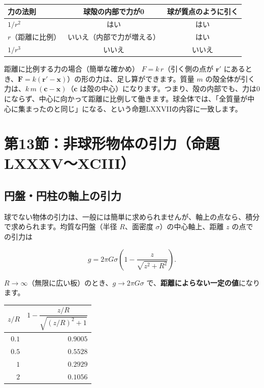 \documentclass[a4paper,11pt,openany]{ltjsbook}
\begin{document}
\begin{center}
\begin{tabular}{lcc}
\toprule
力の法則 & 球殻の内部で力が0 & 球が質点のように引く\\
\midrule
$1/r^2$ & はい & はい\\
$r$（距離に比例） & いいえ（内部で力が増える） & はい\\
$1/r^3$ & いいえ & いいえ\\
\bottomrule
\end{tabular}
\end{center}

\begin{examplebox}{距離に比例する力の場合（簡単な確かめ）}
$F=k\,r$（引く側の点が $\mathbf r'$ にあるとき、$\mathbf F=k(\mathbf r'-\mathbf x)$）の形の力は、足し算ができます。質量 $m$ の殻全体が引く力は、$k\,m\,(\mathbf c-\mathbf x)$（$\mathbf c$ は殻の中心）になります。つまり、殻の内部でも、力は0にならず、中心に向かって距離に比例して働きます。球全体では、「全質量が中心に集まったのと同じ」になる、という命題LXXVIIの内容に一致します。
\end{examplebox}

\section{第13節：非球形物体の引力（命題LXXXV〜XCIII）}

\subsection{円盤・円柱の軸上の引力}

球でない物体の引力は、一般には簡単に求められませんが、軸上の点なら、積分で求められます。均質な円盤（半径 $R$、面密度 $\sigma$）の中心軸上、距離 $z$ の点での引力は

\[
g=2\pi G\sigma\left(1-\frac{z}{\sqrt{z^2+R^2}}\right).
\]

$R\to\infty$（無限に広い板）のとき、$g\to2\pi G\sigma$ で、\textbf{距離によらない一定の値}になります。

\begin{center}
\begin{tabular}{rr}
\toprule
$z/R$ & $1-\dfrac{z/R}{\sqrt{(z/R)^2+1}}$\\
\midrule
$0.1$ & $0.9005$\\
$0.5$ & $0.5528$\\
$1$ & $0.2929$\\
$2$ & $0.1056$\\
\bottomrule
\end{tabular}
\end{center}
\end{document}
